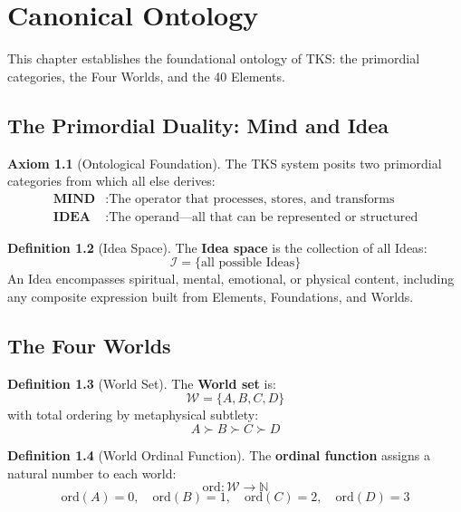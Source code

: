 \documentclass[11pt,twoside,openright]{book}
\theoremstyle{definition}
\newtheorem{definition}{Definition}[chapter]
\newtheorem{axiom}[definition]{Axiom}
\theoremstyle{plain}
\theoremstyle{remark}
\newcommand{\Worlds}{\mathcal{W}}
\newcommand{\Ideas}{\mathcal{I}}
\newcommand{\ord}{\mathrm{ord}}
\begin{document}
\chapter{Canonical Ontology}
\label{ch:ontology}

This chapter establishes the foundational ontology of TKS: the primordial categories, the Four Worlds, and the 40 Elements.

\section{The Primordial Duality: Mind and Idea}

\begin{axiom}[Ontological Foundation]
\label{ax:ontological-foundation}
The TKS system posits two primordial categories from which all else derives:
\begin{align}
\textbf{MIND} &: \text{The operator that processes, stores, and transforms} \\
\textbf{IDEA} &: \text{The operand---all that can be represented or structured}
\end{align}
\end{axiom}

\begin{definition}[Idea Space]
\label{def:idea-space}
The \textbf{Idea space} is the collection of all Ideas:
\[
\Ideas = \{\text{all possible Ideas}\}
\]
An Idea encompasses spiritual, mental, emotional, or physical content, including any composite expression built from Elements, Foundations, and Worlds.
\end{definition}

\section{The Four Worlds}

\begin{definition}[World Set]
\label{def:world-set}
The \textbf{World set} is:
\[
\Worlds = \{A, B, C, D\}
\]
with total ordering by metaphysical subtlety:
\[
A \succ B \succ C \succ D
\]
\end{definition}

\begin{definition}[World Ordinal Function]
\label{def:world-ord}
The \textbf{ordinal function} assigns a natural number to each world:
\[
\ord : \Worlds \to \mathbb{N}
\]
\[
\ord(A) = 0, \quad \ord(B) = 1, \quad \ord(C) = 2, \quad \ord(D) = 3
\]
\end{definition}
\end{document}
